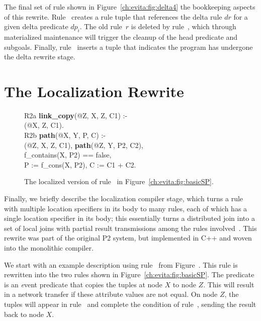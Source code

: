 The final set of rule shown in Figure~\ref{ch:evita:fig:delta4} the bookkeeping
aspects of this rewrite.  Rule~ creates a rule tuple that references
the delta rule $dr$ for a given delta predicate $dp_i$.  The old rule~$r$ is
deleted by rule~, which through materialized maintenance will trigger
the cleanup of the head predicate and subgoals.  Finally, rule~ inserts
a  tuple that indicates the program has undergone the delta rewrite
stage.



\section{The Localization Rewrite}
\label{ch:evita:sec:local}

\begin{figure}[!t]
\ssp
\centering
\begin{boxedminipage}{\linewidth}
R2a {\bf link\_copy}(@Z, X, Z, C1) :- \\
(@X, Z, C1). \\

R2b {\bf path}(@X, Y, P, C) :- \\
(@Z, X, Z, C1), {\bf path}(@Z, Y, P2, C2),\\
\datalogspace f\_contains(X, P2) == false, \\
\datalogspace P := f\_cons(X, P2), C := C1 + C2. \\

\end{boxedminipage}
\caption{\label{ch:evita:fig:basicSPLocal}The localized version of rule~ in
Figure~\ref{ch:evita:fig:basicSP}.}
\end{figure}

Finally, we briefly describe the localization compiler stage, which turns a
rule with multiple location specifiers in its body to many rules, each of which
has a single location specifier in its body; this essentially turns a
distributed join into a set of local joins with partial result transmissions
among the rules involved~\cite{loo-sigmod06}.  This rewrite was part of the
original P2 system, but implemented in C++ and woven into the monolithic
compiler. 

We start with an example description using rule~ from
Figure~.  This rule is rewritten into the two rules shown
in Figure~\ref{ch:evita:fig:basicSP}.  The  predicate is an
{\emph event} predicate that copies the  tuples at node $X$ to node
$Z$.  This will result in a network transfer if these attribute values are not
equal.  On node $Z$, the  tuples will appear in rule~
and complete the condition of rule~, sending the result back to node
$X$.

